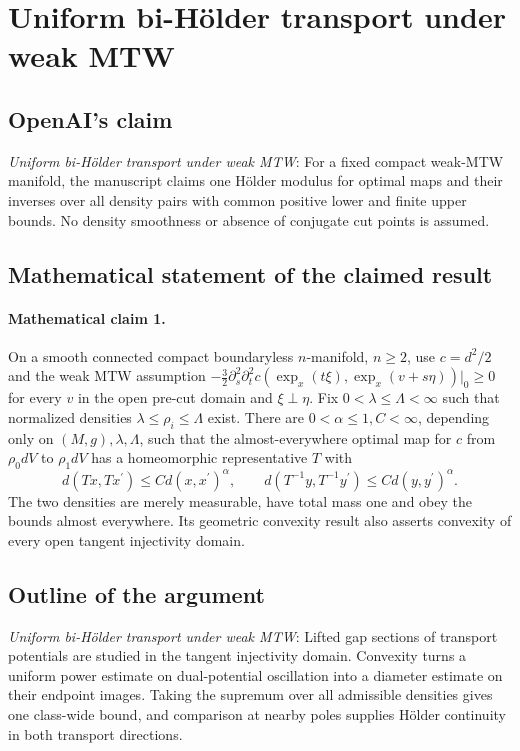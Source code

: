 \documentclass[11pt]{article}
\begin{document}
\section*{Uniform bi-Hölder transport under weak MTW}

\subsection{OpenAI's claim}
\textit{Uniform bi-Hölder transport under weak MTW}: For a fixed compact weak-MTW manifold, the manuscript claims one Hölder modulus for optimal maps and their inverses over all density pairs with common positive lower and finite upper bounds. No density smoothness or absence of conjugate cut points is assumed.

\subsection{Mathematical statement of the claimed result}
\paragraph{Mathematical claim 1.} On a smooth connected compact boundaryless $n$-manifold, $n\ge2$, use $c=d^2/2$ and the weak MTW assumption $-\tfrac32\partial_s^2\partial_t^2c(\exp_x(t\xi),\exp_x(v+s\eta))|_0\ge0$ for every $v$ in the open pre-cut domain and $\xi\perp\eta$. Fix $0<\lambda\le\Lambda<\infty$ such that normalized densities $\lambda\le\rho_i\le\Lambda$ exist. There are $0<\alpha\le1,C<\infty$, depending only on $(M,g),\lambda,\Lambda$, such that the almost-everywhere optimal map for $c$ from $\rho_0dV$ to $\rho_1dV$ has a homeomorphic representative $T$ with \[d(Tx,Tx^\prime)\le Cd(x,x^\prime)^\alpha,\qquad d(T^{-1}y,T^{-1}y^\prime)\le Cd(y,y^\prime)^\alpha.\] The two densities are merely measurable, have total mass one and obey the bounds almost everywhere. Its geometric convexity result also asserts convexity of every open tangent injectivity domain.

\subsection{Outline of the argument}
\textit{Uniform bi-Hölder transport under weak MTW}: Lifted gap sections of transport potentials are studied in the tangent injectivity domain. Convexity turns a uniform power estimate on dual-potential oscillation into a diameter estimate on their endpoint images. Taking the supremum over all admissible densities gives one class-wide bound, and comparison at nearby poles supplies Hölder continuity in both transport directions.
\end{document}
